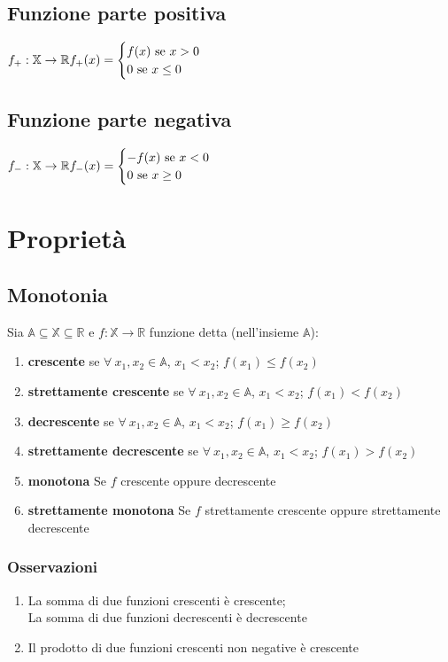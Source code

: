 \subsection{Funzione parte positiva}
$f_+: \mathbb{X} \rightarrow \mathbb{R}\\
f_+(x)=\begin{cases}
f(x) \text{  se } x>0\\
0 \text{  se } x \leq 0\\
\end{cases}$
\subsection{Funzione parte negativa}
$f_-: \mathbb{X} \rightarrow \mathbb{R}\\
f_-(x)=\begin{cases}
-f(x) \text{  se } x<0\\
0 \text{  se } x \geq 0\\
\end{cases}$
\section{Proprietà}
\subsection{Monotonia}
Sia $\mathbb{A} \subseteq \mathbb{X} \subseteq \mathbb{R}$ e $f: \mathbb{X} \rightarrow \mathbb{R}$ funzione detta (nell'insieme $\mathbb{A}$):
\begin{enumerate}
\item \textbf{crescente} se $\forall\ x_1,x_2 \in \mathbb{A}$, $x_1<x_2$; $f(x_1) \leq f(x_2)$
\item \textbf{strettamente crescente} se $\forall\ x_1,x_2 \in \mathbb{A}$, $x_1<x_2$; $f(x_1) < f(x_2)$
\item \textbf{decrescente} se $\forall\ x_1,x_2 \in \mathbb{A}$, $x_1<x_2$; $f(x_1) \geq f(x_2)$
\item \textbf{strettamente decrescente} se $\forall\ x_1,x_2 \in \mathbb{A}$, $x_1<x_2$; $f(x_1) > f(x_2)$
\item \textbf{monotona} Se $f$ crescente oppure decrescente
\item \textbf{strettamente monotona} Se $f$ strettamente crescente oppure strettamente decrescente
\end{enumerate}
\subsubsection{Osservazioni}
\begin{enumerate}
\item La somma di due funzioni crescenti è crescente;\\
La somma di due funzioni decrescenti è decrescente
\item Il prodotto di due funzioni crescenti non negative è crescente
\end{enumerate}

